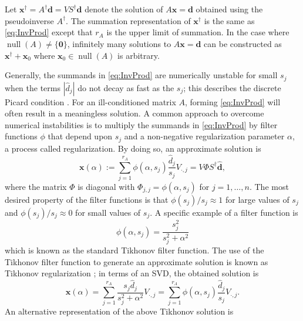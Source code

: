 \documentclass[12pt]{article}
\newcommand{\rA}{r_A}	%
\newcommand{\dVec}{\mathbf{d}}	%
\newcommand{\xVec}{\mathbf{x}}	%
\newcommand{\pinv}[1]{{#1}^\dagger}	%
\DeclareMathOperator{\nullspace}{null}	%
\newcommand{\regparam}{\alpha}  %
\newcommand{\filt}{\phi}
\newcommand{\zeroVec}{\bm{0}}	%
\newcommand{\singular}{s}	%
\newcommand{\svd}[1]{\widehat{#1}}	%
\begin{document}
Let $\pinv{\xVec} = \pinv{A}\dVec = V\pinv{S}\svd{\dVec}$ denote the solution of $A\xVec = \dVec$ obtained using the pseudoinverse $\pinv{A}$. The summation representation of $\pinv{\xVec}$ is the same as \eqref{eq:InvProd} except that $\rA$ is the upper limit of summation. In the case where $\nullspace(A) \neq \{\zeroVec\}$, infinitely many solutions to $A\xVec = \dVec$ can be constructed as $\pinv{\xVec} + \xVec_0$ where $\xVec_0 \in \nullspace(A)$ is arbitrary. \par
Generally, the summands in \eqref{eq:InvProd} are numerically unstable for small $\singular_j$ when the terms $\left|\svd{d}_j\right|$ do not decay as fast as the $\singular_j$; this describes the discrete Picard condition \cite{Hansen:98}. For an ill-conditioned matrix $A$, forming \eqref{eq:InvProd} will often result in a meaningless solution. A common approach to overcome numerical instabilities is to multiply the summands in \eqref{eq:InvProd} by filter functions $\filt$ that depend upon $\singular_j$ and a non-negative regularization parameter $\regparam$, a process called regularization. By doing so, an approximate solution is
\begin{equation}
\label{eq:ApproxSol}
\xVec(\regparam) := \sum_{j=1}^{\rA} \filt(\regparam,\singular_j) \frac{\svd{d}_j}{\singular_j}V_{\cdot,j}  = V\Phi{S}^\dagger\svd{\dVec},
\end{equation}
where the matrix $\Phi$ is diagonal with $\Phi_{j,j} = \filt(\regparam,\singular_j)$ for $j = 1,\ldots,{n}$. The most desired property of the filter functions is that $\filt(\singular_j)/\singular_j \approx 1$  for large values of $\singular_j$ and $\filt(\singular_j)/\singular_j \approx 0$ for small values of $\singular_j$. A specific example of a filter function is
\begin{equation}
\label{eq:TikFilt}
\filt(\regparam,\singular_j)  = \frac{\singular_j^2}{\singular_j^2 + \regparam^2}
\end{equation}
which is known as the standard Tikhonov filter function. The use of the Tikhonov filter function to generate an approximate solution is known as Tikhonov regularization \cite{Tikh1963}; in terms of an SVD, the obtained solution is
\begin{equation}
\label{eq:TikSol}
\xVec(\regparam) = \sum_{j = 1}^{\rA} \frac{\singular_j \svd{d}_j}{\singular_j^2 + \regparam^2}V_{\cdot,j} = \sum_{j = 1}^{\rA} \filt(\regparam,\singular_j)\frac{\svd{d}_j}{\singular_j}V_{\cdot,j}.
\end{equation}
An alternative representation of the above Tikhonov solution is
\end{document}
